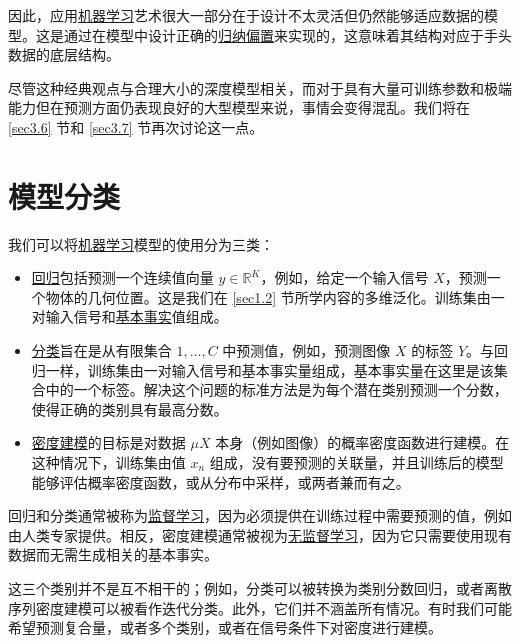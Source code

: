 因此，应用\underline{机器学习}艺术很大一部分在于设计不太灵活但仍然能够适应数据的模型。这是通过在模型中设计正确的\underline{归纳偏置}来实现的，这意味着其结构对应于手头数据的底层结构。

尽管这种经典观点与合理大小的深度模型相关，而对于具有大量可训练参数和极端能力但在预测方面仍表现良好的大型模型来说，事情会变得混乱。我们将在 \ref{sec3.6} 节和 \ref{sec3.7} 节再次讨论这一点。

\section{模型分类}

我们可以将\underline{机器学习}模型的使用分为三类：

\begin{itemize}
    \item \underline{回归}包括预测一个连续值向量 $y \in \mathbb{R}^K$，例如，给定一个输入信号 $X$，预测一个物体的几何位置。这是我们在 \ref{sec1.2} 节所学内容的多维泛化。训练集由一对输入信号和\underline{基本事实}值组成。
    \item \underline{分类}旨在是从有限集合 ${1,\dots,C}$ 中预测值，例如，预测图像 $X$ 的标签 $Y$。与回归一样，训练集由一对输入信号和基本事实量组成，基本事实量在这里是该集合中的一个标签。解决这个问题的标准方法是为每个潜在类别预测一个分数，使得正确的类别具有最高分数。
    \item \underline{密度建模}的目标是对数据 $\mu X$ 本身（例如图像）的概率密度函数进行建模。在这种情况下，训练集由值 $x_n$ 组成，没有要预测的关联量，并且训练后的模型能够评估概率密度函数，或从分布中采样，或两者兼而有之。
\end{itemize}

回归和分类通常被称为\underline{监督学习}，因为必须提供在训练过程中需要预测的值，例如由人类专家提供。相反，密度建模通常被视为\underline{无监督学习}，因为它只需要使用现有数据而无需生成相关的基本事实。

这三个类别并不是互不相干的；例如，分类可以被转换为类别分数回归，或者离散序列密度建模可以被看作迭代分类。此外，它们并不涵盖所有情况。有时我们可能希望预测复合量，或者多个类别，或者在信号条件下对密度进行建模。